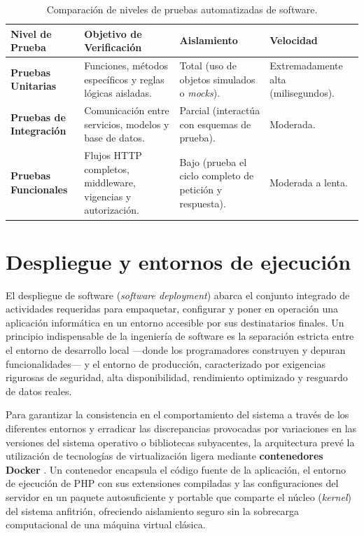 \begin{table}[htbp]
\centering
\caption{Comparación de niveles de pruebas automatizadas de software.}
\label{tabla:niveles_pruebas}
\small
\begin{tabularx}{\textwidth}{|p{3.0cm}|X|X|X|}
\hline
\rowcolor[gray]{0.9}
\textbf{Nivel de Prueba} & \textbf{Objetivo de Verificación} & \textbf{Aislamiento} & \textbf{Velocidad} \\
\hline
\textbf{Pruebas Unitarias} & Funciones, métodos específicos y reglas lógicas aisladas. & Total (uso de objetos simulados o \textit{mocks}). & Extremadamente alta (milisegundos). \\
\hline
\textbf{Pruebas de Integración} & Comunicación entre servicios, modelos y base de datos. & Parcial (interactúa con esquemas de prueba). & Moderada. \\
\hline
\textbf{Pruebas Funcionales} & Flujos HTTP completos, middleware, vigencias y autorización. & Bajo (prueba el ciclo completo de petición y respuesta). & Moderada a lenta. \\
\hline
\end{tabularx}
\end{table}

\section{Despliegue y entornos de ejecución}

El despliegue de software (\textit{software deployment}) abarca el conjunto integrado de actividades requeridas para empaquetar, configurar y poner en operación una aplicación informática en un entorno accesible por sus destinatarios finales. Un principio indispensable de la ingeniería de software es la separación estricta entre el entorno de desarrollo local —donde los programadores construyen y depuran funcionalidades— y el entorno de producción, caracterizado por exigencias rigurosas de seguridad, alta disponibilidad, rendimiento optimizado y resguardo de datos reales.

Para garantizar la consistencia en el comportamiento del sistema a través de los diferentes entornos y erradicar las discrepancias provocadas por variaciones en las versiones del sistema operativo o bibliotecas subyacentes, la arquitectura prevé la utilización de tecnologías de virtualización ligera mediante \textbf{contenedores Docker} \cite{docker2024overview}. Un contenedor encapsula el código fuente de la aplicación, el entorno de ejecución de PHP con sus extensiones compiladas y las configuraciones del servidor en un paquete autosuficiente y portable que comparte el núcleo (\textit{kernel}) del sistema anfitrión, ofreciendo aislamiento seguro sin la sobrecarga computacional de una máquina virtual clásica.


